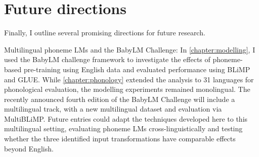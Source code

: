 

\section{Future directions}
\label{sec:17-futurework}

Finally, I outline several promising directions for future research.

Multilingual phoneme LMs and the BabyLM Challenge:
In \cref{chapter:modelling}, I used the BabyLM challenge framework to investigate the effects of phoneme-based pre-training using English data and evaluated performance using BLiMP and GLUE. While \cref{chapter:phonology} extended the analysis to 31 languages for phonological evaluation, the modelling experiments remained monolingual. The recently announced fourth edition of the BabyLM Challenge will include a multilingual track, with a new multilingual dataset and evaluation via MultiBLiMP. Future entries could adapt the techniques developed here to this multilingual setting, evaluating phoneme LMs cross-linguistically and testing whether the three identified input transformations have comparable effects beyond English.


